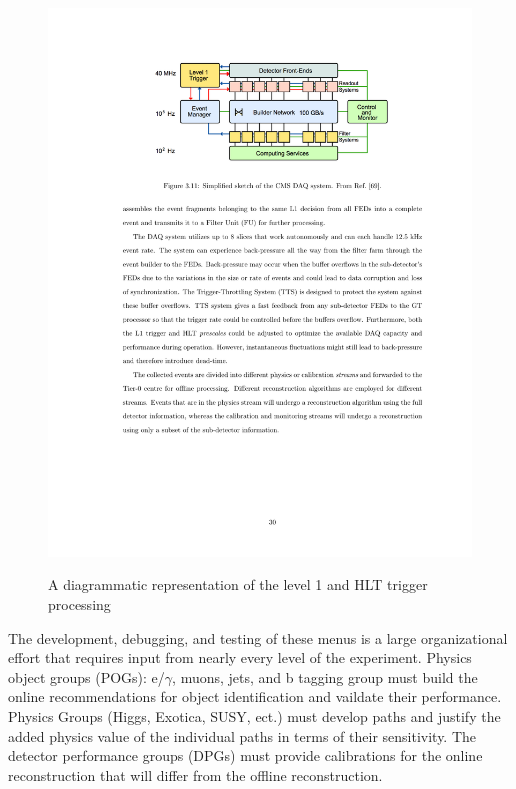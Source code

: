 \begin{figure}
\begin{center}
\includegraphics[width=.95\textwidth]{pics/daq_diagram}\\
\caption{A diagrammatic representation of the level 1 and HLT trigger processing}
\label{tab:daq_diagram}
\end{center}
\end{figure}

The development, debugging, and testing of these menus
is a large organizational effort that requires input from nearly every level of the experiment. 
Physics object groups (POGs):  e/$\gamma$, muons, jets, and b tagging group must build
the online recommendations for object identification and vaildate their performance.
 Physics Groups (Higgs, Exotica, SUSY, ect.) must develop paths and justify the
added physics value of the individual paths in terms of their sensitivity. The detector performance groups (DPGs) 
must provide  calibrations for the online reconstruction that will differ from
the offline reconstruction. 

